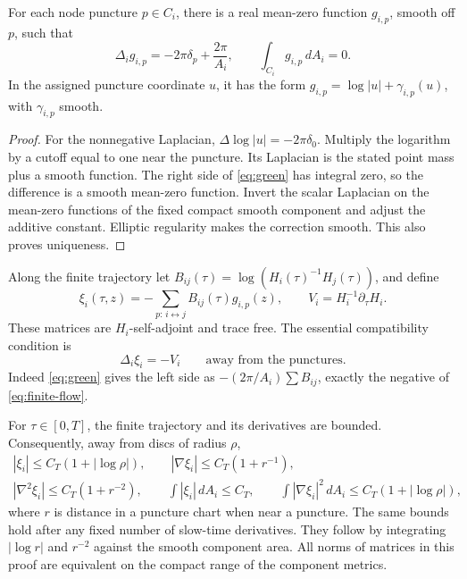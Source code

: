 \begin{lemma}\label{lem:green}
For each node puncture $p\in C_i$, there is a real mean-zero function
$g_{i,p}$, smooth off $p$, such that
\begin{equation}\label{eq:green}
 \Delta_i g_{i,p}=-2\pi\delta_p+\frac{2\pi}{A_i},
 \qquad\int_{C_i}g_{i,p}\,dA_i=0.
\end{equation}
In the assigned puncture coordinate $u$, it has the form
$g_{i,p}=\log|u|+\gamma_{i,p}(u)$, with $\gamma_{i,p}$ smooth.
\end{lemma}
\begin{proof}
For the nonnegative Laplacian,
$\Delta\log|u|=-2\pi\delta_0$. Multiply the logarithm by a cutoff
equal to one near the puncture. Its Laplacian is the stated point
mass plus a smooth function. The right side of \eqref{eq:green}
has integral zero, so the difference is a smooth mean-zero function.
Invert the scalar Laplacian on the mean-zero functions of the fixed
compact smooth component and adjust the additive constant. Elliptic
regularity makes the correction smooth. This also proves uniqueness.
\end{proof}

Along the finite trajectory let
$B_{ij}(\tau)=\log(H_i(\tau)^{-1}H_j(\tau))$, and define
\begin{equation}\label{eq:component-potential}
 \xi_i(\tau,z)=-\sum_{p:\,i\leftrightarrow j}B_{ij}(\tau)g_{i,p}(z),
 \qquad V_i=H_i^{-1}\partial_\tau H_i.
\end{equation}
These matrices are $H_i$-self-adjoint and trace free. The essential
compatibility condition is
\begin{equation}\label{eq:compatibility}
 \Delta_i\xi_i=-V_i\qquad\text{away from the punctures}.
\end{equation}
Indeed \eqref{eq:green} gives the left side as
$-(2\pi/A_i)\sum B_{ij}$, exactly the negative of
\eqref{eq:finite-flow}.

For $\tau\in[0,T]$, the finite trajectory and its derivatives are
bounded. Consequently, away from discs of radius $\rho$,
\begin{equation}\label{eq:potential-bounds}
 \begin{gathered}
 |\xi_i|\le C_T(1+|\log\rho|),\qquad
 |\nabla\xi_i|\le C_T(1+r^{-1}),\\
 |\nabla^2\xi_i|\le C_T(1+r^{-2}),\qquad
 \int|\xi_i|\,dA_i\le C_T,\qquad
 \int|\nabla\xi_i|^2\,dA_i\le C_T(1+|\log\rho|),
 \end{gathered}
\end{equation}
where $r$ is distance in a puncture chart when near a puncture.
The same bounds hold after any fixed number of slow-time derivatives.
They follow by integrating $|\log r|$ and $r^{-2}$ against the
smooth component area. All norms of matrices in this proof are
equivalent on the compact range of the component metrics.
